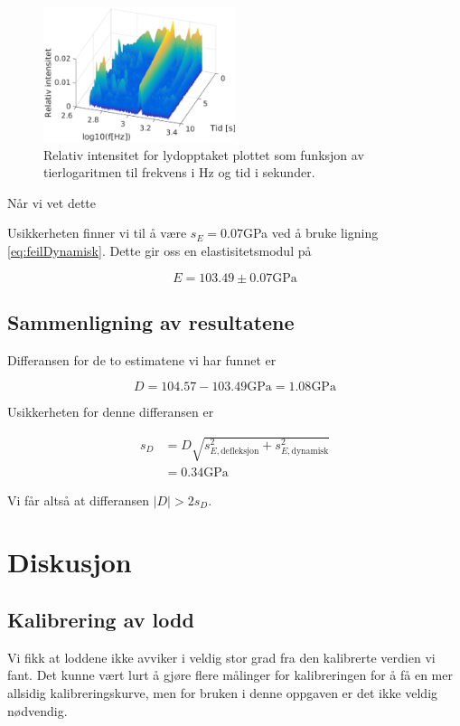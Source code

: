 \documentclass[a4paper,11pt, twocolumn]{article}
\begin{document}
\begin{figure}[!ht]
	\includegraphics[width = 0.5\textwidth]{matlab/wavelet.eps}
	\caption{Relativ intensitet for lydopptaket plottet som funksjon av tierlogaritmen til frekvens i Hz og tid i sekunder.}
	\label{fig:wavelet}
\end{figure}

Når vi vet dette 

Usikkerheten finner vi til å være $s_E = 0.07$GPa ved å bruke ligning \ref{eq:feilDynamisk}. Dette gir oss en elastisitetsmodul på

\begin{equation}
	E = 103.49\pm0.07\text{GPa}
\end{equation}

\subsection{Sammenligning av resultatene}
Differansen for de to estimatene vi har funnet er 

\begin{equation}
	D = 104.57-103.49\text{GPa} = 1.08\text{GPa} 
\end{equation}

Usikkerheten for denne differansen er 

\begin{align}
s_D &= D\sqrt{s_{E, \text{defleksjon}}^2+s_{E, \text{dynamisk}}^2}\\
&= 0.34\text{GPa}
\end{align}

Vi får altså at differansen $|D|>2s_D$.
\section{Diskusjon}

\subsection{Kalibrering av lodd}
Vi fikk at loddene ikke avviker i veldig stor grad fra den kalibrerte verdien vi fant. Det kunne vært lurt å gjøre flere målinger for kalibreringen for å få en mer allsidig kalibreringskurve, men for bruken i denne oppgaven er det ikke veldig nødvendig.
\end{document}
